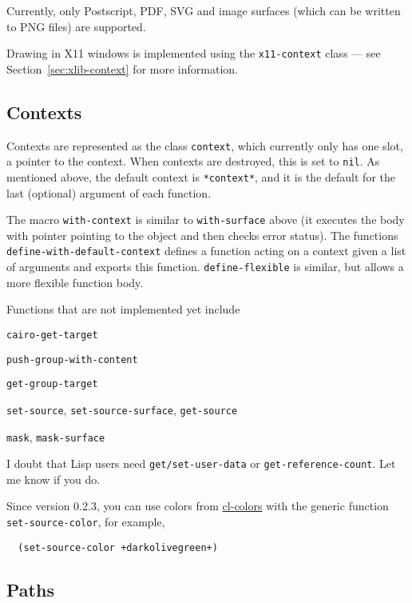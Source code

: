 \documentclass[12pt,letterpaper,dvipdfm]{article}
\begin{document}
Currently, only Postscript, PDF, SVG and image surfaces (which can be
written to PNG files) are supported.

Drawing in X11 windows is implemented using the
\lstinline!x11-context! class --- see Section~\ref{sec:xlib-context}
for more information.

\subsection{Contexts}
\label{sec:contexts}

Contexts are represented as the class \lstinline!context!, which
currently only has one slot, a pointer to the context.  When contexts
are destroyed, this is set to \lstinline!nil!.  As mentioned above,
the default context is \lstinline!*context*!, and it is the default
for the last (optional) argument of each function.

The macro \lstinline!with-context! is similar to
\lstinline!with-surface! above (it executes the body with pointer
pointing to the object and then checks error status).  The functions
\lstinline!define-with-default-context! defines a function acting on a
context given a list of arguments and exports this function.
\lstinline!define-flexible! is similar, but allows a more flexible
function body.

Functions that are not implemented yet include
\begin{compactitem}
  \item \lstinline!cairo-get-target!
  \item \lstinline!push-group-with-content!
  \item \lstinline!get-group-target!
  \item \lstinline!set-source!, \lstinline!set-source-surface!,
    \lstinline!get-source!
  \item \lstinline!mask!, \lstinline!mask-surface!
\end{compactitem}
I doubt that Lisp users need \lstinline!get/set-user-data! or
\lstinline!get-reference-count!.  Let me know if you do.

Since version 0.2.3, you can use colors from
\href{http://www.cliki.net/cl-colors}{cl-colors} with the generic
function \lstinline!set-source-color!, for example,
\begin{lstlisting}
  (set-source-color +darkolivegreen+)
\end{lstlisting}


\subsection{Paths}
\label{sec:paths}
\end{document}
